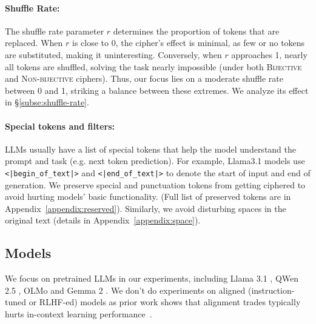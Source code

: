 \documentclass[11pt]{article}
\newcommand{\fzx}[1]{\textbf{\color{blue}[{\bf Zhouxiang}: #1]}}
\newcommand{\gemma}{Gemma 2 }
\newcommand{\qwen}{QWen 2.5 }
\newcommand{\olmo}{OLMo }
\begin{document}
\paragraph{Shuffle Rate:}
The shuffle rate parameter \(r\) determines the proportion of tokens that are replaced.
When \(r\) is close to 0, the cipher's effect is minimal, as few or no tokens are substituted, making it uninteresting.
Conversely, when \(r\) approaches 1, nearly all tokens are shuffled, solving the task nearly impossible (under both \textsc{Bijective} and \textsc{Non-bijective} ciphers).
Thus, our focus lies on a moderate shuffle rate between 0 and 1, striking a balance between these extremes.
We analyze its effect in \S\ref{subse:shuffle-rate}.


\paragraph{Special tokens and filters:}
LLMs usually have a list of special tokens that help the model understand the prompt and task (e.g. next token prediction).
For example, Llama3.1 models use  \texttt{<|begin\_of\_text|>} and \texttt{<|end\_of\_text|>} to denote the start of input and end of generation.
We preserve special and punctuation tokens from getting ciphered to avoid hurting models' basic functionality. (Full list of preserved tokens are in Appendix~\ref{appendix:reserved}). Similarly, we avoid disturbing spaces in the original text (details in Appendix~\ref{appendix:space}).


\subsection{Models}
\label{subsec:models}
We focus on pretrained LLMs in our experiments, including Llama 3.1 \cite[\texttt{Llama-3.1-8B}]{dubey2024llama3herdmodels}, \qwen \cite[\texttt{Qwen2.5-7B}]{qwen2.5}, \olmo \cite[\texttt{OLMo-7B-0724-hf}]{Groeneveld2023OLMo} and \gemma \cite[\texttt{Gemma-2-9b}]{gemma_2024}.
We don't do experiments on aligned (instruction-tuned or RLHF-ed) models as prior work shows that alignment trades typically hurts in-context learning performance~\cite{fu2022does}.

\end{document}
